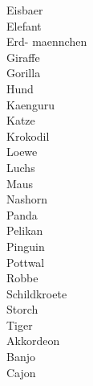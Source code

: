 \documentclass{article}
\begin{document}
Eisbaer
\newpage
\phantom{ }\\

Elefant
\newpage
\phantom{ }\\

Erd-
maennchen
\newpage
\phantom{ }\\

Giraffe
\newpage
\phantom{ }\\

Gorilla
\newpage
\phantom{ }\\

Hund
\newpage
\phantom{ }\\

Kaenguru
\newpage
\phantom{ }\\

Katze
\newpage
\phantom{ }\\

Krokodil
\newpage
\phantom{ }\\

Loewe
\newpage
\phantom{ }\\

Luchs
\newpage
\phantom{ }\\

Maus
\newpage
\phantom{ }\\

Nashorn
\newpage
\phantom{ }\\

Panda
\newpage
\phantom{ }\\

Pelikan
\newpage
\phantom{ }\\

Pinguin
\newpage
\phantom{ }\\

Pottwal
\newpage
\phantom{ }\\

Robbe
\newpage
\phantom{ }\\

Schildkroete
\newpage
\phantom{ }\\

Storch
\newpage
\phantom{ }\\

Tiger
\newpage
\phantom{ }\\

Akkordeon
\newpage
\phantom{ }\\

Banjo
\newpage
\phantom{ }\\

Cajon
\newpage
\phantom{ }\\
\end{document}
